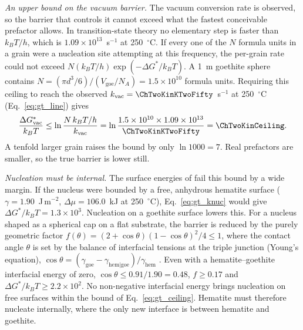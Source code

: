 \textit{An upper bound on the vacuum barrier.} The vacuum conversion rate is observed, so the
barrier that controls it cannot exceed what the fastest conceivable prefactor allows. In
transition-state theory \citep{eyring1935} no elementary step is faster than $k_BT/h$, which is
$1.09\times10^{13}$~s$^{-1}$ at 250~$^\circ$C. If every one of the $N$ formula units in a grain were a
nucleation site attempting at this frequency, the per-grain rate could not exceed
$N(k_BT/h)\exp(-\Delta G^{*}/k_BT)$. A 1~\textmu m goethite sphere contains
$N = (\pi d^3/6)/(V_{\mathrm{goe}}/N_A) = 1.5\times10^{10}$ formula units. Requiring this ceiling to
reach the observed $k_{\mathrm{vac}} = \ChTwoKinKTwoFifty$~s$^{-1}$ at 250~$^\circ$C (Eq.~\eqref{eq:gt_line})
gives
\begin{equation}
  \frac{\Delta G^{*}_{\mathrm{vac}}}{k_BT} \le \ln\frac{N\,k_BT/h}{k_{\mathrm{vac}}}
  = \ln\frac{1.5\times10^{10}\times1.09\times10^{13}}{\ChTwoKinKTwoFifty} = \ChTwoKinCeiling .
  \label{eq:gt_ceiling}
\end{equation}
A tenfold larger grain raises the bound by only $\ln 1000 = 7$. Real prefactors are smaller, so the
true barrier is lower still.

\textit{Nucleation must be internal.} The surface energies of \citet{navrotsky2008} fail this
bound by a wide margin. If the nucleus were bounded by a free, anhydrous hematite surface
($\gamma = 1.90$~J\,m$^{-2}$, $\Delta\mu = 106.0$~kJ at 250~$^\circ$C), Eq.~\eqref{eq:gt_knuc} would give
$\Delta G^{*}/k_BT = 1.3\times10^{3}$. Nucleation on a goethite surface lowers this. For a nucleus
shaped as a spherical cap on a flat substrate, the barrier is reduced by the purely geometric
factor
$f(\theta) = (2+\cos\theta)(1-\cos\theta)^2/4 \le 1$, where the contact angle $\theta$ is set by the
balance of interfacial tensions at the triple junction (Young's equation),
$\cos\theta = (\gamma_{\mathrm{goe}} - \gamma_{\mathrm{hem|goe}})/\gamma_{\mathrm{hem}}$
\citep{volmer1926,turnbull1950}. Even with a hematite--goethite interfacial energy of zero,
$\cos\theta \le 0.91/1.90 = 0.48$, $f\ge0.17$ and $\Delta G^{*}/k_BT\ge2.2\times10^{2}$. No
non-negative interfacial energy brings nucleation on free surfaces within the bound of
Eq.~\eqref{eq:gt_ceiling}. Hematite must therefore nucleate internally, where the only new
interface is between hematite and goethite.

